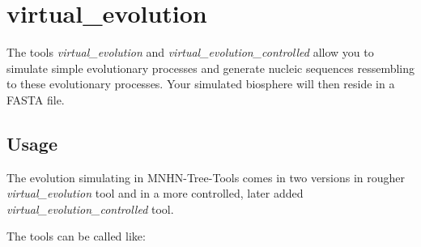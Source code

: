 \section{virtual\_evolution} \label{sec-virtual-ev}

The tools \emph{virtual\_evolution} and
\emph{virtual\_evolution\_controlled} allow you to simulate simple
evolutionary processes and generate nucleic sequences ressembling to
these evolutionary processes. Your simulated biosphere will then
reside in a FASTA file.

\subsection{Usage}

The evolution simulating in MNHN-Tree-Tools comes in two versions in
rougher \emph{virtual\_evolution} tool and in a more controlled, later
added \emph{virtual\_evolution\_controlled} tool.

The tools can be called like:

